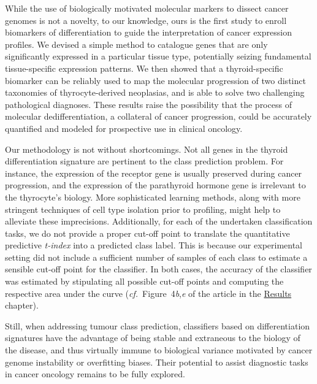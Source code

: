 While the use of biologically motivated molecular markers to dissect cancer
genomes is not a novelty,\cite{sund_tumor_2009,dave_prediction_2004} to our
knowledge, ours is the first study to enroll biomarkers of differentiation to
guide the interpretation of cancer expression profiles.  We devised a simple
method to catalogue genes that are only significantly expressed in a particular
tissue type, potentially seizing fundamental tissue-specific expression
patterns.  We then showed that a thyroid-specific biomarker can be reliably used
to map the molecular progression of two distinct taxonomies of thyrocyte-derived
neoplasias, and is able to solve two challenging pathological diagnoses.  These
results raise the possibility that the process of molecular dedifferentiation, a
collateral of cancer progression, could be accurately quantified and modeled for
prospective use in clinical oncology.

Our methodology is not without shortcomings.  Not all genes in the thyroid
differentiation signature are pertinent to the class prediction problem.  For
instance, the expression of the  receptor gene is usually
preserved during cancer progression,\cite{dagostino_different_2014} and the
expression of the parathyroid hormone gene is irrelevant to the thyrocyte's
biology.  More sophisticated learning methods, along with more stringent
techniques of cell type isolation prior to profiling, might help to alleviate
these imprecisions.  Additionally, for each of the undertaken classification
tasks, we do not provide a proper cut-off point to translate the quantitative
predictive \emph{t-index} into a predicted class label.  This is because our
experimental setting did not include a sufficient number of samples of each
class to estimate a sensible cut-off point for the classifier.  In both cases,
the accuracy of the classifier was estimated by stipulating all possible cut-off
points and computing the respective area under the  curve
(\mbox{\emph{cf.}  Figure~4\emph{b},\emph{e}} of the article in the
\hyperref[chap:results]{\textsf{Results}} chapter).

Still, when addressing tumour class prediction, classifiers based on
differentiation signatures have the advantage of being stable and extraneous to
the biology of the disease, and thus virtually immune to biological variance
motivated by cancer genome instability or overfitting biases.  Their potential
to assist diagnostic tasks in cancer oncology remains to be fully explored.


